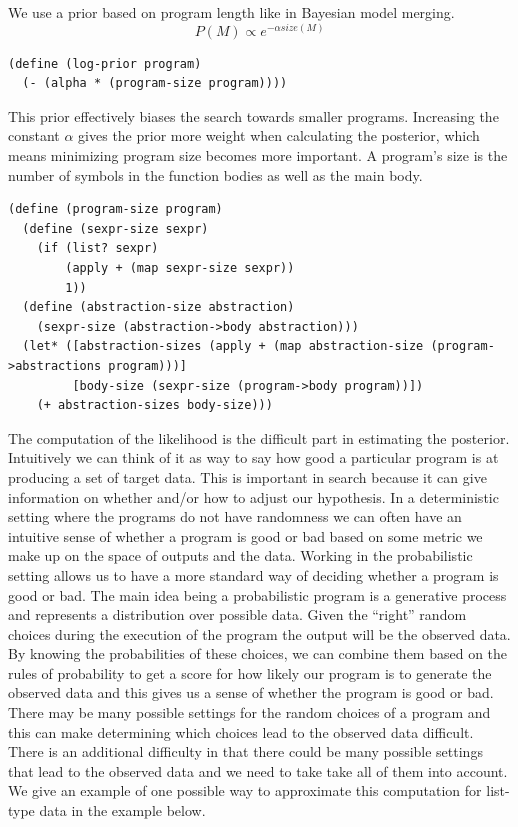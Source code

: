 \documentclass[a4paper,10pt]{article}
\begin{document}
We use a prior based on program length like in Bayesian model merging.  
\begin{equation}P(M)\propto e^{-\alpha size(M)}\end{equation}
\begin{lstlisting}[frame=trBL]
(define (log-prior program)
  (- (alpha * (program-size program))))
\end{lstlisting}
This prior effectively biases the search towards smaller programs.  Increasing the constant $\alpha$ gives the prior more weight when calculating the posterior, which means minimizing program size becomes more important.  A program's size is the number of symbols in the function bodies as well as the main body.
\begin{lstlisting}[frame=trBL]
(define (program-size program)
  (define (sexpr-size sexpr)
    (if (list? sexpr)
        (apply + (map sexpr-size sexpr))
        1))
  (define (abstraction-size abstraction)
    (sexpr-size (abstraction->body abstraction)))
  (let* ([abstraction-sizes (apply + (map abstraction-size (program->abstractions program)))]
         [body-size (sexpr-size (program->body program))])
    (+ abstraction-sizes body-size)))
\end{lstlisting}
The computation of the likelihood is the difficult part in estimating the posterior.  Intuitively we can think of it as way to say how good a particular program is at producing a set of target data.  This is important in search because it can give information on whether and/or how to adjust our hypothesis.  In a deterministic setting where the programs do not have randomness we can often have an intuitive sense of whether a program is good or bad based on some metric we make up on the space of outputs and the data.  Working in the probabilistic setting allows us to have a more standard way of deciding whether a program is good or bad.  The main idea being a probabilistic program is a generative process and represents a distribution over possible data.  Given the ``right'' random choices during the execution of the program the output will be the observed data.  By knowing the probabilities of these choices, we can combine them based on the rules of probability to get a score for how likely our program is to generate the observed data and this gives us a sense of whether the program is good or bad.  There may be many possible settings for the random choices of a program and this can make determining which choices lead to the observed data difficult.  There is an additional difficulty in that there could be many possible settings that lead to the observed data and we need to take take all of them into account.  We give an example of one possible way to approximate this computation for list-type data in the example below.
\end{document}
